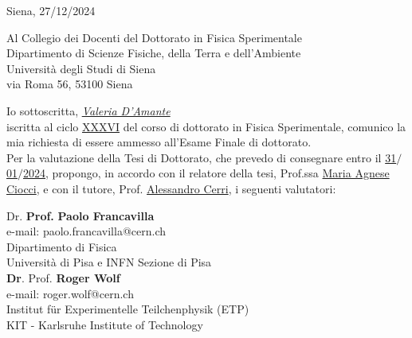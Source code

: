 \documentclass[12pt,a4paper,oneside]{extarticle}
\begin{document}
\pagestyle{default_page}
\begin{flushright}
Siena, 27/12/2024
\end{flushright}

Al Collegio dei Docenti del Dottorato in Fisica Sperimentale\\

Dipartimento di Scienze Fisiche, della Terra e dell'Ambiente\\

Università degli Studi di Siena\\

via Roma 56, 53100 Siena\\
\vspace{1cm}

\noindent Io sottoscritta, \textit{\underline{Valeria D'Amante}}\\

\noindent iscritta al ciclo \underline{XXXVI} del corso di dottorato in Fisica Sperimentale, comunico la mia richiesta di essere ammesso all'Esame Finale di dottorato.\\

\noindent Per la valutazione della Tesi di Dottorato, che prevedo di consegnare entro il \underline{31}$/$\underline{01}$/$\underline{2024}, propongo, in accordo con il relatore della tesi, Prof.ssa \underline{Maria Agnese Ciocci}, e con il tutore, Prof. \underline{Alessandro Cerri}, i seguenti valutatori:\\
\vspace{1cm}

\noindent \makebox[0pt][l]{$\square$}{ } \hspace{2mm}Dr. \/ \makebox[0pt][l]{$\square$}{$\times$} \textbf{Prof.} \textbf{Paolo Francavilla}\\
e-mail: paolo.francavilla@cern.ch \\
Dipartimento di Fisica \\
Università di Pisa e INFN Sezione di Pisa\\

\vspace{1cm}
\noindent\makebox[0pt][l]{$\square$}{$\times$}\textbf{Dr}. \/ \makebox[0pt][l]{$\square$}{ } \hspace{2mm} Prof. \textbf{Roger Wolf}\\
e-mail: roger.wolf@cern.ch \\
Institut für Experimentelle Teilchenphysik (ETP) \\
KIT - Karlsruhe Institute of Technology \\
\end{document}

